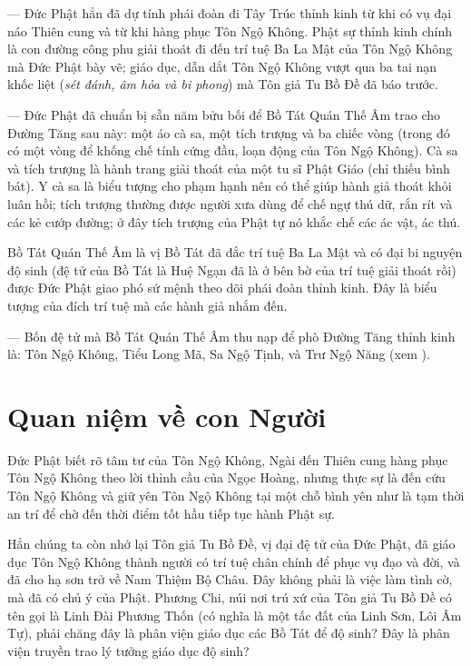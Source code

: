 — Đức Phật hẳn đã dự tính phái đoàn đi Tây Trúc thỉnh kinh từ khi có vụ đại náo Thiên cung và từ khi hàng phục Tôn Ngộ Không. Phật sự thỉnh kinh chính là con đường công phu giải thoát đi đến trí tuệ Ba La Mật của Tôn Ngộ Không mà Đức Phật bày vẽ; giáo dục, dẫn dắt Tôn Ngộ Không vượt qua ba tai nạn khốc liệt (\emph{sét đánh, âm hỏa và bi phong}) mà Tôn giả Tu Bồ Đề đã báo trước.

— Đức Phật đã chuẩn bị sẵn năm bửu bối để Bồ Tát Quán Thế Âm trao cho Đường Tăng sau này: một áo cà sa, một tích trượng và ba chiếc vòng (trong đó có một vòng để khống chế tính cứng đầu, loạn động của Tôn Ngộ Không). Cà sa và tích trượng là hành trang giải thoát của một tu sĩ Phật Giáo (chỉ thiếu bình bát). Y cà sa là biểu tượng cho phạm hạnh nên có thể giúp hành giả thoát khỏi luân hồi; tích trượng thường được người xưa dùng để chế ngự thú dữ, rắn rít và các kẻ cướp đường; ở đây tích trượng của Phật tự nó khắc chế các ác vật, ác thú.

Bồ Tát Quán Thế Âm là vị Bồ Tát đã đắc trí tuệ Ba La Mật và có đại bi nguyện độ sinh (đệ tử của Bồ Tát là Huệ Ngạn đã là ở bên bờ của trí tuệ giải thoát rồi) được Đức Phật giao phó sứ mệnh theo dõi phái đoàn thỉnh kinh. Đây là biểu tượng của đích trí tuệ mà các hành giả nhắm đến.

— Bốn đệ tử mà Bồ Tát Quán Thế Âm thu nạp để phò Đường Tăng thỉnh kinh là: Tôn Ngộ Không, Tiểu Long Mã, Sa Ngộ Tịnh, và Trư Ngộ Năng (xem ).

\section{Quan niệm về con Người} %
\label{sec:8_con_nguoi}

Đức Phật biết rõ tâm tư của Tôn Ngộ Không, Ngài đến Thiên cung hàng phục Tôn Ngộ Không theo lời thỉnh cầu của Ngọc Hoàng, nhưng thực sự là đến cứu Tôn Ngộ Không và giữ yên Tôn Ngộ Không tại một chỗ bình yên như là tạm thời an trí để chờ đến thời điểm tốt hầu tiếp tục hành Phật sự.

Hẳn chúng ta còn nhớ lại Tôn giả Tu Bồ Đề, vị đại đệ tử của Đức Phật, đã giáo dục Tôn Ngộ Không thành người có trí tuệ chân chính để phục vụ đạo và đời, và đã cho hạ sơn trở về Nam Thiệm Bộ Châu. Đây không phải là việc làm tình cờ, mà đã có chủ ý của Phật. Phương Chi, núi nơi trú xứ của Tôn giả Tu Bồ Đề có tên gọi là Linh Đài Phương Thốn (có nghĩa là một tấc đất của Linh Sơn, Lôi Âm Tự), phải chăng đây là phân viện giáo dục các Bồ Tát để độ sinh? Đây là phân viện truyền trao lý tưởng giáo dục độ sinh?

